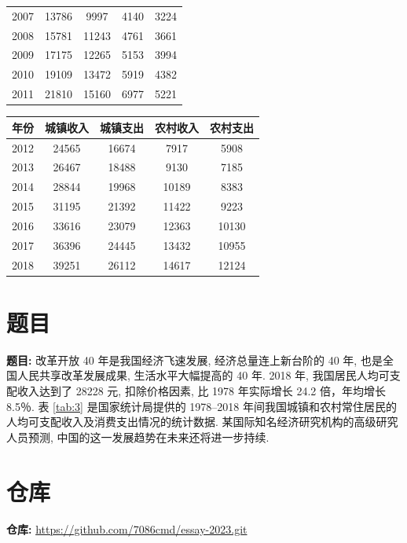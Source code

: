 \documentclass{article}
\begin{document}
\begin{appendices}
\begin{table}[H]
\begin{tabular}{ccccc}
    2007 & 13786 & 9997 & 4140 & 3224 \\
    2008 & 15781 & 11243 & 4761 & 3661 \\
    2009 & 17175 & 12265 & 5153 & 3994 \\
    2010 & 19109 & 13472 & 5919 & 4382 \\
    2011 & 21810 & 15160 & 6977 & 5221 \\
    \hline
  \end{tabular}
\end{table}
\begin{table}[H]
  \centering
  \begin{tabular}{ccccc}
    \hline
    \textbf{年份} & \textbf{城镇收入} & \textbf{城镇支出} & \textbf{农村收入} & \textbf{农村支出} \\
    \hline
    2012 & 24565 & 16674 & 7917 & 5908 \\
    2013 & 26467 & 18488 & 9130 & 7185 \\
    2014 & 28844 & 19968 & 10189 & 8383 \\
    2015 & 31195 & 21392 & 11422 & 9223 \\
    2016 & 33616 & 23079 & 12363 & 10130 \\
    2017 & 36396 & 24445 & 13432 & 10955 \\
    2018 & 39251 & 26112 & 14617 & 12124 \\
    \hline
  \end{tabular}
\end{table}

\section{题目}

\begin{mdframed}
  \fangsong
  \textbf{题目:} 改革开放 40 年是我国经济飞速发展, 经济总量连上新台阶的 40 年, 也是全国人民共享改革发展成果, 生活水平大幅提高的 40 年. 2018 年, 我国居民人均可支配收入达到了 28228 元, 扣除价格因素, 比 1978 年实际增长 24.2 倍，年均增长 8.5％. 表 \ref{tab:3} 是国家统计局提供的 1978--2018 年间我国城镇和农村常住居民的人均可支配收入及消费支出情况的统计数据. 某国际知名经济研究机构的高级研究人员预测, 中国的这一发展趋势在未来还将进一步持续.
\end{mdframed}

\section{仓库}

\begin{mdframed}
  \fangsong
  \textbf{仓库:} \url{
    https://github.com/7086cmd/essay-2023.git
  }
\end{mdframed}
\end{appendices}
\end{document}
